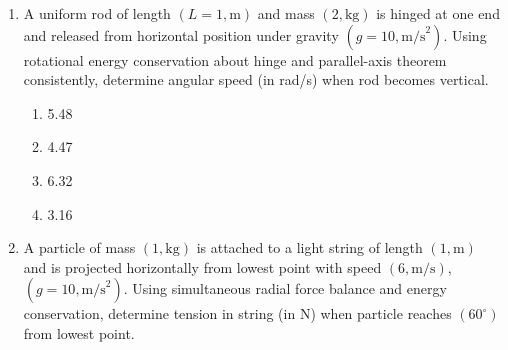 \documentclass[12pt]{article}
\begin{document}
\begin{enumerate}
\begin{center}
\end{center}

\begin{enumerate}[label=\Alph*)]
\item 1.73
\item 2.00
\item 1.25
\item 2.50
\end{enumerate}

\item A uniform rod of length $(L=1,\text{m})$ and mass $(2,\text{kg})$ is hinged at one end and released from horizontal position under gravity $(g=10,\text{m/s}^2)$. Using rotational energy conservation about hinge and parallel-axis theorem consistently, determine angular speed (in rad/s) when rod becomes vertical.




\begin{center}
\end{center}

\begin{enumerate}[label=\Alph*)]
\item 5.48
\item 4.47
\item 6.32
\item 3.16
\end{enumerate}

\item A particle of mass $(1,\text{kg})$ is attached to a light string of length $(1,\text{m})$ and is projected horizontally from lowest point with speed $(6,\text{m/s})$, $(g=10,\text{m/s}^2)$. Using simultaneous radial force balance and energy conservation, determine tension in string (in N) when particle reaches $(60^\circ)$ from lowest point.


\end{enumerate}
\end{document}
